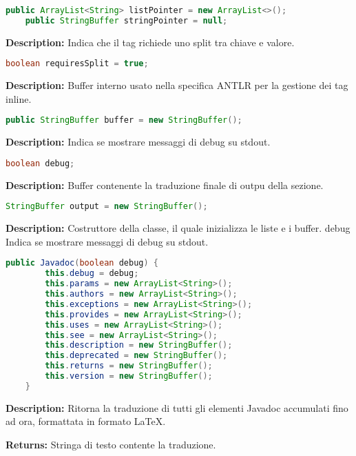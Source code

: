 \documentclass{article}
\begin{document}
\begin{lstlisting}[language=Java]
    public ArrayList<String> listPointer = new ArrayList<>();
    public StringBuffer stringPointer = null;
\end{lstlisting}
\textbf{Description:} Indica che il tag richiede uno split tra chiave e valore.

\begin{lstlisting}[language=Java]
    boolean requiresSplit = true;
\end{lstlisting}
\textbf{Description:} Buffer interno usato nella specifica ANTLR per la gestione dei tag inline.

\begin{lstlisting}[language=Java]
    public StringBuffer buffer = new StringBuffer();
\end{lstlisting}
\textbf{Description:} Indica se mostrare messaggi di debug su stdout.

\begin{lstlisting}[language=Java]
    boolean debug;
\end{lstlisting}
\textbf{Description:} Buffer contenente la traduzione finale di outpu della sezione.

\begin{lstlisting}[language=Java]
    StringBuffer output = new StringBuffer();
\end{lstlisting}
\textbf{Description:}  Costruttore della classe, il quale inizializza le liste e i buffer.  debug Indica se mostrare messaggi di debug su stdout.

\begin{lstlisting}[language=Java]
    public Javadoc(boolean debug) {
        this.debug = debug;
        this.params = new ArrayList<String>();
        this.authors = new ArrayList<String>();
        this.exceptions = new ArrayList<String>();
        this.provides = new ArrayList<String>();
        this.uses = new ArrayList<String>();
        this.see = new ArrayList<String>();
        this.description = new StringBuffer();
        this.deprecated = new StringBuffer();
        this.returns = new StringBuffer();
        this.version = new StringBuffer();
    }
\end{lstlisting}
\textbf{Description:}  Ritorna la traduzione di tutti gli elementi Javadoc accumulati fino ad ora, formattata in formato LaTeX.  

\textbf{Returns:}
Stringa di testo contente la traduzione.  
\end{document}
